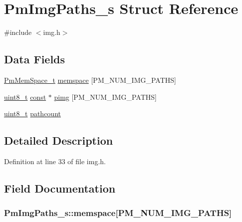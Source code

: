 \hypertarget{struct_pm_img_paths__s}{\section{Pm\-Img\-Paths\-\_\-s Struct Reference}
\label{struct_pm_img_paths__s}
}


{\ttfamily \#include $<$img.\-h$>$}

\subsection*{Data Fields}
\begin{DoxyCompactItemize}
\item 
\hyperlink{mem_8h_a9c68f72c120fc5a782d464c144aafa2b}{Pm\-Mem\-Space\-\_\-t} \hyperlink{struct_pm_img_paths__s_a6358e31073d5077606e455585ece5771}{memspace} \mbox{[}P\-M\-\_\-\-N\-U\-M\-\_\-\-I\-M\-G\-\_\-\-P\-A\-T\-H\-S\mbox{]}
\item 
\hyperlink{stdint_8h_aba7bc1797add20fe3efdf37ced1182c5}{uint8\-\_\-t} \hyperlink{group___n_a_m_e_ga7ae6d0e43244213b34de2c2b9aa30da6}{const} $\ast$ \hyperlink{struct_pm_img_paths__s_ac68b1647a12850e4034da1579c9f3d62}{pimg} \mbox{[}P\-M\-\_\-\-N\-U\-M\-\_\-\-I\-M\-G\-\_\-\-P\-A\-T\-H\-S\mbox{]}
\item 
\hyperlink{stdint_8h_aba7bc1797add20fe3efdf37ced1182c5}{uint8\-\_\-t} \hyperlink{struct_pm_img_paths__s_a84a34ed44ebcba636164d6935c111943}{pathcount}
\end{DoxyCompactItemize}


\subsection{Detailed Description}


Definition at line 33 of file img.\-h.



\subsection{Field Documentation}
\hypertarget{struct_pm_img_paths__s_a6358e31073d5077606e455585ece5771}{
\subsubsection[{memspace}]{ Pm\-Img\-Paths\-\_\-s\-::memspace\mbox{[}P\-M\-\_\-\-N\-U\-M\-\_\-\-I\-M\-G\-\_\-\-P\-A\-T\-H\-S\mbox{]}}}\label{struct_pm_img_paths__s_a6358e31073d5077606e455585ece5771}


